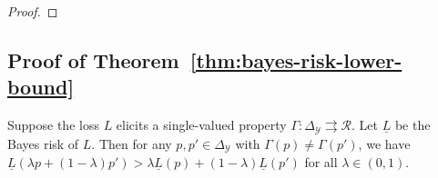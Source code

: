 \documentclass[anon,12pt]{colt2021} %
\newcommand{\reals}{\mathbb{R}}
\newcommand{\simplex}{\Delta_\Y}
\newcommand{\prop}[2][\mathcal{P}]{\mathrm{prop}_{#1}[#2]}
\newcommand{\R}{\mathcal{R}}
\newcommand{\Sc}{\mathcal{S}}  %
\newcommand{\Y}{\mathcal{Y}}
\newcommand{\lbar}{\underline{L}} %
\newcommand{\toto}{\rightrightarrows}
\begin{document}
\begin{proof}
\end{proof}

\subsection{Proof of Theorem~\ref{thm:bayes-risk-lower-bound}}

\begin{lemma}
	\label{lem:elic-complex-bayes-concave}
	Suppose the loss $L$ elicits a single-valued property $\Gamma:\simplex\toto\R$.
	Let $\lbar$ be the Bayes risk of $L$.
	Then for any $p,p'\in\simplex$ with $\Gamma(p)\neq\Gamma(p')$, we have $\lbar(\lambda p + (1-\lambda) p') > \lambda \lbar(p) + (1-\lambda) \lbar(p')$ for all $\lambda\in(0,1)$.
\end{lemma}
\end{document}
